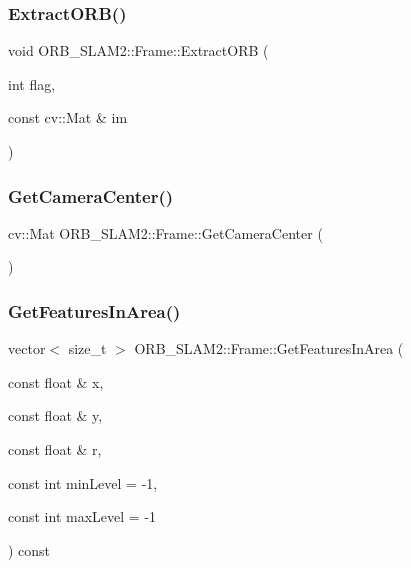 \subsubsection{\texorpdfstring{Extract\+O\+R\+B()}{ExtractORB()}}
{\footnotesize\ttfamily void O\+R\+B\+\_\+\+S\+L\+A\+M2\+::\+Frame\+::\+Extract\+O\+RB (\begin{DoxyParamCaption}\item[{int}]{flag,  }\item[{const cv\+::\+Mat \&}]{im }\end{DoxyParamCaption})}

\mbox{\label{class_o_r_b___s_l_a_m2_1_1_frame_a48c8983df3a521ed7439d9654b28e390}} 
\subsubsection{\texorpdfstring{Get\+Camera\+Center()}{GetCameraCenter()}}
{\footnotesize\ttfamily cv\+::\+Mat O\+R\+B\+\_\+\+S\+L\+A\+M2\+::\+Frame\+::\+Get\+Camera\+Center (\begin{DoxyParamCaption}{ }\end{DoxyParamCaption})\hspace{0.3cm}{\ttfamily [inline]}}

\mbox{\label{class_o_r_b___s_l_a_m2_1_1_frame_a922a340f438ed0ddd2d7d2a9f95872b6}} 
\subsubsection{\texorpdfstring{Get\+Features\+In\+Area()}{GetFeaturesInArea()}}
{\footnotesize\ttfamily vector$<$ size\+\_\+t $>$ O\+R\+B\+\_\+\+S\+L\+A\+M2\+::\+Frame\+::\+Get\+Features\+In\+Area (\begin{DoxyParamCaption}\item[{const float \&}]{x,  }\item[{const float \&}]{y,  }\item[{const float \&}]{r,  }\item[{const int}]{min\+Level = {\ttfamily -\/1},  }\item[{const int}]{max\+Level = {\ttfamily -\/1} }\end{DoxyParamCaption}) const}



